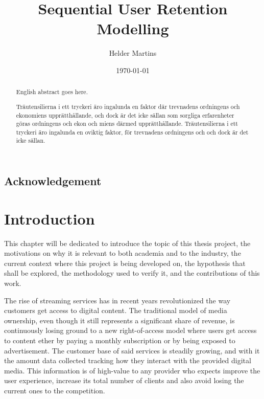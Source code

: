 \documentclass{kththesis}
\title{Sequential User Retention Modelling}
\author{Helder Martins}
\date{\today}
\begin{document}
\flyleaf

\begin{abstract}
  English abstract goes here.
\end{abstract}

\clearpage

\begin{otherlanguage}{swedish}
  \begin{abstract}
    Träutensilierna i ett tryckeri äro ingalunda en faktor där
    trevnadens ordningens och ekonomiens upprätthållande, och dock är
    det icke sällan som sorgliga erfarenheter göras ordningens och
    ekon och miens därmed upprätthållande. Träutensilierna i ett
    tryckeri äro ingalunda en oviktig faktor, för trevnadens
    ordningens och och dock är det icke sällan.
  \end{abstract}
\end{otherlanguage}

\clearpage

\section*{Acknowledgement}


\cleardoublepage

\tableofcontents

\listoffigures
 
\listoftables


\mainmatter


\chapter{Introduction}

	This chapter will be dedicated to introduce the topic of this thesis project, the motivations on why it is relevant to both academia and to the industry, the current context where this project is being developed on, the hypothesis that shall be explored, the methodology used to verify it, and the contributions of this work.
	
	The rise of streaming services has in recent years revolutionized the way customers get access to digital content. The traditional model of media ownership, even though it still represents a significant share of revenue, is continuously losing ground to a new right-of-access model where users get access to content ether by paying a monthly subscription or by being exposed to advertisement. The customer base of said services is steadily growing, and with it the amount data collected tracking how they interact with the provided digital media. This information is of high-value to any provider who expects improve the user experience, increase its total number of clients and also avoid losing the current ones to the competition.
	
\end{document}
